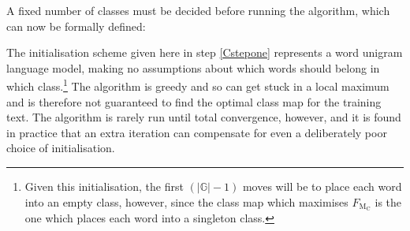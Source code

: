 A fixed number of classes must be decided before running the
algorithm, which can now be formally defined:

\begin{center}\end{center}

The initialisation scheme given here in step \ref{Cstepone} represents
a word unigram language model, making no assumptions about which words
should belong in which class.\footnote{Given this initialisation, the
first $(|\mathbb{G}|-1)$ moves will be to place each word into an
empty class, however, since the class map which maximises
$F_{\mathrm{M}_\mathrm{C}}$ is the one which places each word into a singleton
class.}  The algorithm is greedy and so can get stuck in a local
maximum and is therefore not guaranteed to find the optimal class map
for the training text.  The algorithm is rarely run until total
convergence, however, and it is found in practice that an extra
iteration can compensate for even a deliberately poor choice of
initialisation.

